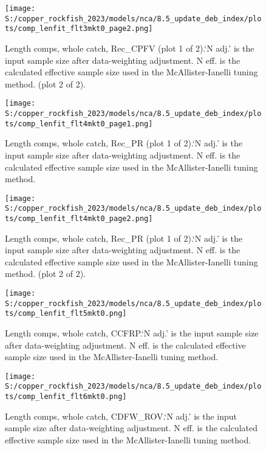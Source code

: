 \documentclass[11pt,
  english,
  letterpaper,
]{article}
\begin{document}
\begin{figure}
\centering
\texttt{[image: S:/copper\_rockfish\_2023/models/nca/8.5\_update\_deb\_index/plots/comp\_lenfit\_flt3mkt0\_page2.png]}
\caption{Length comps, whole catch, Rec\_CPFV (plot 1 of 2).`N adj.' is the input sample size after data-weighting adjustment. N eff. is the calculated effective sample size used in the McAllister-Ianelli tuning method. (plot 2 of 2).\label{fig:comp_lenfit_flt3mkt0_page2}}
\end{figure}

\begin{figure}
\centering
\texttt{[image: S:/copper\_rockfish\_2023/models/nca/8.5\_update\_deb\_index/plots/comp\_lenfit\_flt4mkt0\_page1.png]}
\caption{Length comps, whole catch, Rec\_PR (plot 1 of 2).`N adj.' is the input sample size after data-weighting adjustment. N eff. is the calculated effective sample size used in the McAllister-Ianelli tuning method.\label{fig:comp_lenfit_flt4mkt0_page1}}
\end{figure}

\begin{figure}
\centering
\texttt{[image: S:/copper\_rockfish\_2023/models/nca/8.5\_update\_deb\_index/plots/comp\_lenfit\_flt4mkt0\_page2.png]}
\caption{Length comps, whole catch, Rec\_PR (plot 1 of 2).`N adj.' is the input sample size after data-weighting adjustment. N eff. is the calculated effective sample size used in the McAllister-Ianelli tuning method. (plot 2 of 2).\label{fig:comp_lenfit_flt4mkt0_page2}}
\end{figure}

\begin{figure}
\centering
\texttt{[image: S:/copper\_rockfish\_2023/models/nca/8.5\_update\_deb\_index/plots/comp\_lenfit\_flt5mkt0.png]}
\caption{Length comps, whole catch, CCFRP.`N adj.' is the input sample size after data-weighting adjustment. N eff. is the calculated effective sample size used in the McAllister-Ianelli tuning method.\label{fig:comp_lenfit_flt5mkt0}}
\end{figure}

\begin{figure}
\centering
\texttt{[image: S:/copper\_rockfish\_2023/models/nca/8.5\_update\_deb\_index/plots/comp\_lenfit\_flt6mkt0.png]}
\caption{Length comps, whole catch, CDFW\_ROV.`N adj.' is the input sample size after data-weighting adjustment. N eff. is the calculated effective sample size used in the McAllister-Ianelli tuning method.\label{fig:comp_lenfit_flt6mkt0}}
\end{figure}
\end{document}
